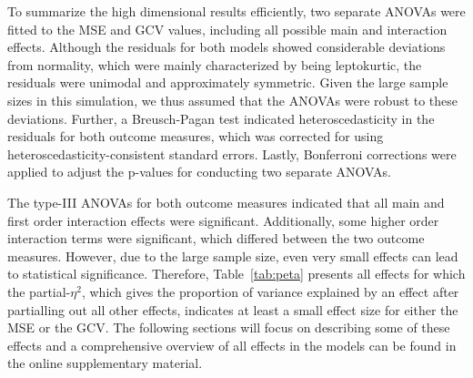 \documentclass[man, floatsintext]{apa7}
\begin{document}
To summarize the high dimensional results efficiently, two separate ANOVAs were
fitted to the MSE and GCV values, including all possible main and interaction
effects. Although the residuals for both models showed considerable deviations
from normality, which were mainly characterized by being leptokurtic, the
residuals were unimodal and approximately symmetric. Given the large sample
sizes in this simulation, we thus assumed that the ANOVAs were robust to these
deviations. Further, a Breusch-Pagan test indicated heteroscedasticity in the
residuals for both outcome measures, which was corrected for using
heteroscedasticity-consistent standard errors. Lastly, Bonferroni corrections
were applied to adjust the p-values for conducting two separate ANOVAs.

The type-III ANOVAs for both outcome measures indicated that all main and first
order interaction effects were significant. Additionally, some higher order
interaction terms were significant, which differed between the two outcome
measures. However, due to the large sample size, even very small effects can
lead to statistical significance. Therefore, Table~\ref{tab:peta} presents all
effects for which the partial-$\eta^2$, which gives the proportion of variance
explained by an effect after partialling out all other effects, indicates at
least a small effect size for either the MSE or the GCV\@. The following
sections will focus on describing some of these effects and a comprehensive
overview of all effects in the models can be found in the online supplementary
material.
\end{document}

